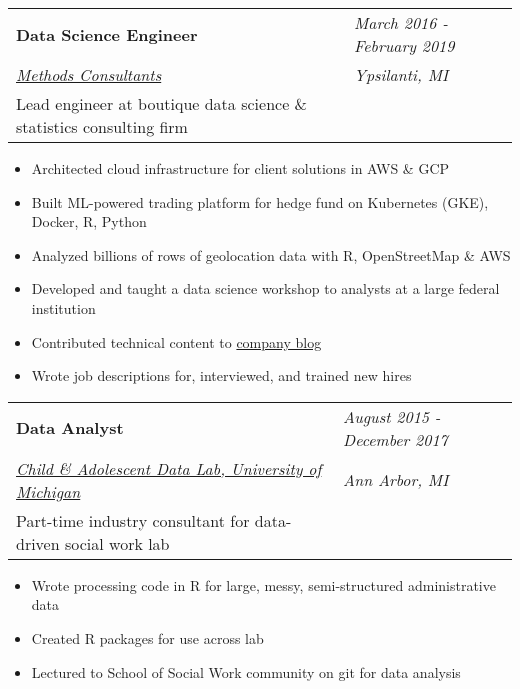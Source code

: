 \documentclass[margin,line]{res}
\begin{document}
\begin{resume}
  \begin{tabular}{p{4.6in} l}
    {\bf Data Science Engineer}                                         & \emph{March 2016 - February 2019} \\
    \href{https://www.methodsconsultants.com/}{\it Methods Consultants} & \emph{Ypsilanti, MI}              \\
    Lead engineer at boutique data science \& statistics consulting firm
  \end{tabular}
  \vspace{2pt}
  \begin{itemize}\itemsep -2pt
    \item Architected cloud infrastructure for client solutions in AWS \& GCP
    \item Built ML-powered trading platform for hedge fund on Kubernetes (GKE), Docker, R, Python
    \item Analyzed billions of rows of geolocation data with R, OpenStreetMap \& AWS
    \item Developed and taught a data science workshop to analysts at a large federal institution
    \item Contributed technical content to \href{https://blog.methodsconsultants.com}{company blog}
    \item Wrote job descriptions for, interviewed, and trained new hires
  \end{itemize}
  
  \begin{tabular}{p{4.6in} l}
    {\bf Data Analyst}                                                                            & \emph{August 2015 - December 2017} \\
    \href{https://www.ssw-datalab.org/}{\it Child \& Adolescent Data Lab, University of Michigan} & \emph{Ann Arbor, MI}               \\
    Part-time industry consultant for data-driven social work lab
  \end{tabular}
  \vspace{2pt}
  \begin{itemize}\itemsep -2pt
    \item Wrote processing code in R for large, messy, semi-structured administrative data
    \item Created R packages for use across lab
    \item Lectured to School of Social Work community on git for data analysis
  \end{itemize}
  

\end{resume}
\end{document}
